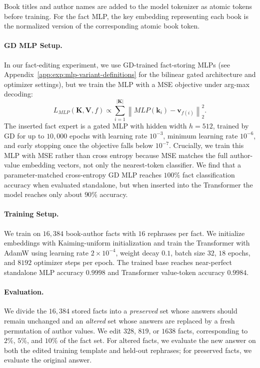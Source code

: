 Book titles and author names are added to the model tokenizer as atomic tokens before training. For the fact MLP, the key embedding representing each book is the normalized version of the corresponding atomic book token.

\paragraph{GD MLP Setup.}
In our fact-editing experiment, we use GD-trained fact-storing MLPs (see Appendix~\ref{app:exp:mlp-variant-definitions} for the bilinear gated architecture and optimizer settings), but we train the MLP with a MSE objective under arg-max decoding:
\[
L_{MLP}(\mathbf{K}, \mathbf{V}, f)
\propto
\sum_{i=1}^{|\mathbf{K}|}
\left\lVert
MLP(\mathbf{k}_i) - \mathbf{v}_{f(i)}
\right\rVert_2^2.
\]
The inserted fact expert is a gated MLP with hidden width \(h=512\),
trained by GD for up to \(10{,}000\) epochs with learning rate \(10^{-3}\),
minimum learning rate \(10^{-6}\), and early stopping once the objective falls
below \(10^{-7}\).
Crucially, we train this MLP with MSE rather than cross entropy because MSE
matches the full author-value embedding vectors, not only the nearest-token
classifier. We find that a parameter-matched cross-entropy GD MLP reaches \(100\%\) fact
classification accuracy when evaluated standalone, but when inserted into the Transformer the model reaches only about \(90\%\) accuracy.

\paragraph{Training Setup.}
We train on \(16{,}384\) book-author facts with \(16\) rephrases per fact. We
initialize embeddings with Kaiming-uniform initialization and train the
Transformer with AdamW using learning rate \(2\times10^{-4}\), weight decay
\(0.1\), batch size \(32\), \(18\) epochs, and \(8192\) optimizer steps per epoch.
The trained base reaches near-perfect standalone MLP accuracy \(0.9998\) and Transformer value-token accuracy \(0.9984\).


\paragraph{Evaluation.}
We divide the \(16{,}384\) stored facts into a \emph{preserved} set whose answers should remain unchanged and an \emph{altered} set whose answers are replaced by a fresh permutation of author values.
We edit \(328\), \(819\), or \(1638\) facts, corresponding to \(2\%\),
\(5\%\), and \(10\%\) of the fact set. For altered facts, we evaluate the
new answer on both the edited training template and held-out rephrases; for
preserved facts, we evaluate the original answer.

